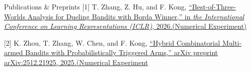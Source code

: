 \begin{rSection}{Publications \& Preprints}
{\small
[1] T. Zhang, Z. Hu, and F. Kong, \href{https://panreta.github.io/publications/}{``Best-of-Three-Worlds Analysis for Dueling Bandits with Borda Winner,'' in \textit{the International Conference on Learning Representations (ICLR)}, 2026.\space\href{https://github.com/Panreta/Numerical_BoBW}{(Numerical Experiment)}}
}

\vspace{-0.5em}

{\small
[2] K. Zhou, T. Zhang, W. Chen, and F. Kong, \href{https://arxiv.org/pdf/2512.21925} {``Hybrid Combinatorial Multi-armed Bandits with Probabilistically Triggered Arms,'' arXiv preprint arXiv:2512.21925, 2025.}\space\href{https://github.com/Panreta/ContextualMAB.github.io}{(Numerical Experiment}
}
\end{rSection}